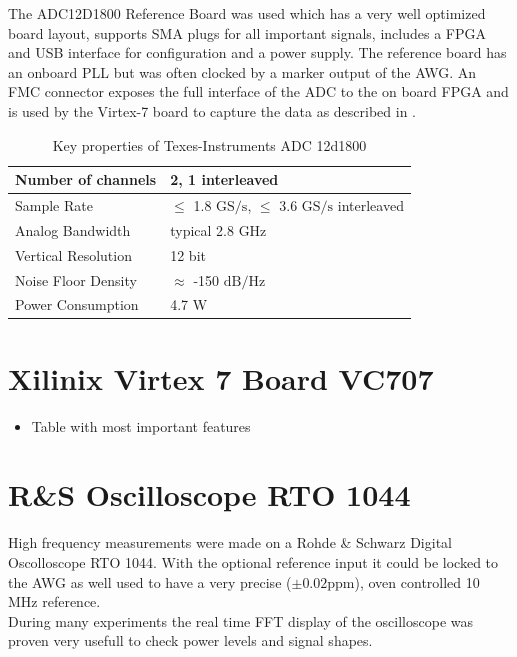 The ADC12D1800 Reference Board was used which has a very well optimized board
layout, supports SMA plugs for all important signals, includes a \gls{FPGA}
and \gls{USB} interface for configuration and a power supply. The reference
board has an onboard \gls{PLL} but was often clocked by a marker output of the
\gls{AWG}. An \gls{FMC} connector exposes the full interface of the \gls{ADC} to
the on board \gls{FPGA} and is used by the Virtex-7 board to capture the data
as described in . \\

\begin{table}[h]
  \centering
  \begin{tabular}{|l|l|}
    \hline
    Number of channels & 2, 1 interleaved \\ \hline
    Sample Rate & $\leq$ 1.8 $\text{GS}/\text{s}$, $\leq$ 3.6 $\text{GS}/\text{s}$ interleaved \\ \hline
    Analog Bandwidth & typical 2.8 GHz \\ \hline
    Vertical Resolution & 12 bit \\ \hline
    Noise Floor Density & $\approx$ -150 $\text{dB}/\text{Hz}$ \\ \hline
    Power Consumption & 4.7 W \\ \hline
  \end{tabular}
  \caption{Key properties of Texes-Instruments ADC 12d1800}
  \label{tab:awg}
\end{table}

\section{Xilinix Virtex 7 Board VC707}
\label{sec:comp_virtex7}
\begin{itemize}
\item Table with most important features
\end{itemize}

\section{R\&S Oscilloscope RTO 1044}
\label{sec:comp_osci}
High frequency measurements were made on a Rohde \& Schwarz Digital
Oscolloscope RTO 1044. With the optional reference input it could be locked
to the \gls{AWG} as well used to have a very precise ($\pm 0.02 \text{ppm}$),
oven controlled 10 MHz reference. \\

During many experiments the real time \gls{FFT} display of the oscilloscope was
proven very usefull to check power levels and signal shapes. \\

